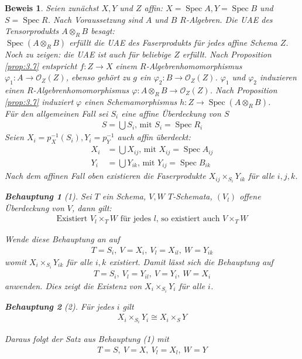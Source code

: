 \documentclass[a4paper,oneside]{scrbook}
\theoremstyle{break}
\theoremstyle{nonumberbreak}
\newtheorem{Beh}{Behauptung}
\theoremstyle{nonumberplain}
\newtheorem{Bew}{Beweis}
\theoremstyle{break}
\newcommand{\Spec}{%
	\ensuremath{\operatorname{Spec}}%
}
\begin{document}
\begin{Bew}
  Seien zunächst $X,Y$ und $Z$ affin: $X=\Spec A,Y=\Spec B$ und $S=\Spec R$. Nach Voraussetzung sind $A$ und $B$ $R$-Algebren.
  Die UAE des Tensorprodukts $A\otimes_R B$ besagt: \\
  $\Spec(A\otimes_R B)$ erfüllt die UAE des Faserprodukts für jedes affine Schema $Z$. \\
  Noch zu zeigen: die UAE ist auch für beliebige $Z$ erfüllt. 
  Nach Proposition \ref{prop:3.7} entspricht $f:Z\to X$ einem $R$-Algebrenhomomorphismus $\varphi_1:A\to\mathcal O_Z(Z)$,
  ebenso gehört zu $g$ ein $\varphi_2:B\to\mathcal O_Z(Z)$. $\varphi_1$ und $\varphi_2$ induzieren einen $R$-Algebrenhomomorphismus
  $\varphi:A\otimes_R B\to\mathcal O_Z(Z)$. Nach Proposition \ref{prop:3.7} induziert $\varphi$ einen Schemamorphismus $h:Z\to\Spec(A\otimes_R B)$. \\
  Für den allgemeinen Fall sei $S_i$ eine affine Überdeckung von $S$
  \begin{align*}
    S=\bigcup S_i \text{, mit } S_i=\Spec R_i
  \end{align*}
  Seien $X_i=p_X^{-1}(S_i), Y_i=p_Y^{-1}$ auch affin überdeckt:
  \begin{align*}
     X_i&=\bigcup X_{ij}\text{, mit } X_{ij}=\Spec A_{ij} \\
      Y_i&=\bigcup Y_{ik}\text{, mit } Y_{ij}=\Spec B_{ik}
  \end{align*}
  Nach dem affinen Fall oben existieren die Faserprodukte $X_{ij}\times_{S_i} Y_{ik}$ für alle $i,j,k$.
  \begin{Beh}[1]
    Sei $T$ ein Schema, $V,W$ $T$-Schemata, $(V_l)$ offene Überdeckung von $V$, dann gilt:
    \begin{align*}
      \text{Existiert $V_l\times_T W$ für jedes $l$, so existiert auch $V\times_T W$}
    \end{align*}
    
  \end{Beh}
  Wende diese Behauptung an auf 
  \begin{align*}
    T=S_i,~ V=X_i,~ V_l=X_{il},~ W=Y_{ik}
  \end{align*}
  womit $X_i\times_{S_i} Y_{ik}$ für alle $i,k$ existiert. Damit lässt sich die Behauptung auf
  \begin{align*}
    T=S_i,~ V_l=Y_{il},~ V=Y_i,~ W=X_i
  \end{align*}
  anwenden. Dies zeigt die Existenz von $X_i\times_{S_i}Y_i$ für alle $i$.
  \begin{Beh}[2]
    Für jedes $i$ gilt
    \begin{align*}
      X_i\times_{S_i}Y_i\cong X_i\times_S Y
    \end{align*}
  \end{Beh}
  Daraus folgt der Satz aus Behauptung (1) mit
  \begin{align*}
    T=S,~ V=X,~ V_l=X_l,~ W=Y
  \end{align*}
\end{Bew}
\end{document}
